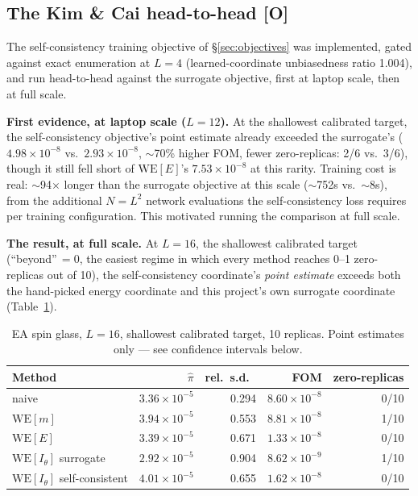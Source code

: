 \documentclass[a4paper,fleqn]{cas-sc}
\begin{document}
\subsection{The Kim \& Cai head-to-head \textbf{[O]}}\label{sec:kimcai}
The self-consistency training objective of \S\ref{sec:objectives} was implemented, gated
against exact enumeration at $L=4$ (learned-coordinate unbiasedness ratio 1.004), and run
head-to-head against the surrogate objective, first at laptop scale, then at full scale.

\textbf{First evidence, at laptop scale ($L=12$).} At the shallowest calibrated target, the
self-consistency objective's point estimate already exceeded the surrogate's
($4.98\times10^{-8}$ vs.\ $2.93\times10^{-8}$, $\sim$70\% higher FOM, fewer zero-replicas:
2/6 vs.\ 3/6), though it still fell short of $\mathrm{WE}[E]$'s $7.53\times10^{-8}$ at this
rarity. Training cost is real: $\sim$94$\times$ longer than the surrogate objective at this
scale ($\sim$752s vs.\ $\sim$8s), from the additional $N=L^2$ network evaluations the
self-consistency loss requires per training configuration. This motivated running the
comparison at full scale.

\textbf{The result, at full scale.} At $L=16$, the shallowest calibrated target (``beyond''\,$=0$,
the easiest regime in which every method reaches 0--1 zero-replicas out of 10), the
self-consistency coordinate's \emph{point estimate} exceeds both the hand-picked energy
coordinate and this project's own surrogate coordinate (Table~\ref{tab:kimcai}).

\begin{table}[H]
\centering\small
\caption{EA spin glass, $L=16$, shallowest calibrated target, 10 replicas. Point estimates
	only --- see confidence intervals below.}
\label{tab:kimcai}
\begin{tabular}{lrrrr}
	\toprule
	Method & $\hat\pi$ & rel.\ s.d.\ & FOM & zero-replicas \\
	\midrule
	naive & $3.36\times10^{-5}$ & 0.294 & $8.60\times10^{-8}$ & 0/10 \\
	$\mathrm{WE}[m]$ & $3.94\times10^{-5}$ & 0.553 & $8.81\times10^{-8}$ & 1/10 \\
	$\mathrm{WE}[E]$ & $3.39\times10^{-5}$ & 0.671 & $1.33\times10^{-8}$ & 0/10 \\
	$\mathrm{WE}[I_\theta]$ surrogate & $2.92\times10^{-5}$ & 0.904 & $8.62\times10^{-9}$ & 1/10 \\
	$\mathrm{WE}[I_\theta]$ self-consistent & $4.01\times10^{-5}$ & 0.655 &
	$1.62\times10^{-8}$ & 0/10 \\
	\bottomrule
\end{tabular}
\end{table}
\end{document}
